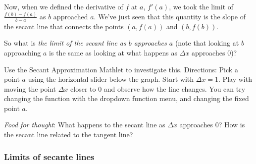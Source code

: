 \documentclass[pdftex, brazil, 12pt, twoside]{article}
\begin{document}
Now, when we defined the derivative of $f$ at $a$, $f'(a)$, we took the limit of
$\displaystyle \frac{f(b) - f(a)}{b - a}$ as $b$ approached $a$. We've just seen
that this quantity is the slope of the secant line that connects the points
$(a, f(a))$ and $(b, f(b))$.

So what is \emph{the limit of the secant line as $b$
  approaches $a$} (note that looking at $b$ approaching $a$ is the same as looking
at what happens as $\Delta x$ approaches 0)?

Use the Secant Approximation Mathlet to investigate this.
Directions: Pick a point $a$ using the horizontal slider below the graph. Start with
$\Delta x = 1$. Play with moving the point $\Delta x$ closer to $0$ and observe how
the line changes. You can try changing the function with the dropdown function menu,
and changing the fixed point $a$.

\emph{Food for thought}: What happens to the secant line as $\Delta x$
approaches $0$? How is the secant line related to the tangent line?

\begin{figure}[H]
  \begin{center}
  \end{center}
\end{figure}

\subsubsection{Limits of secante lines}
\label{u1-geometric-limits-of-secant-lines}
\end{document}

